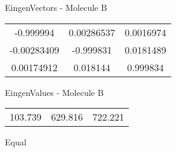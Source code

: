 \begin{multicols}{2}
\begin{center}
\vtab
 EingenVectors - Molecule B     \\
\vtab
\begin{tabular}{|c c c|}
-0.999994	 & 	0.00286537	 & 	0.0016974	 \\
-0.00283409	 & 	-0.999831	 & 	0.0181489	 \\
0.00174912	 & 	0.018144	 & 	0.999834
\end{tabular}

\vtab
 EingenValues - Molecule B     \\
\vtab
\begin{tabular}{|c c c|}
103.739	 & 	629.816	 & 	722.221	 \\
\end{tabular}

\end{center}
\end{multicols}
\begin{center}
\vtab
\vtab
\textcolor{NavyBlue}{\Large Equal}
\end{center}

 \newpage

